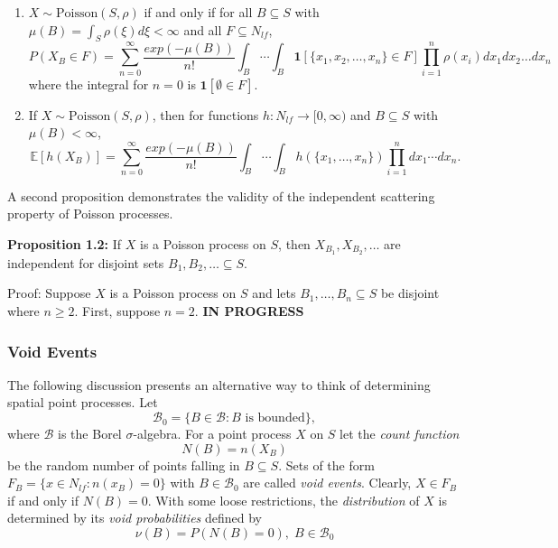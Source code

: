 \documentclass[12pt,twoside]{reedthesis}
\begin{document}
  \begin{enumerate}
  \def\labelenumi{(\roman{enumi})}
  \itemsep1pt\parskip0pt
  \item
    \(X\sim \text{Poisson}(S, \rho)\) if and only if for all
    \(B\subseteq S\) with \(\mu(B) = \int_S \rho(\xi) d\xi < \infty\) and
    all \(F\subseteq N_{lf}\),
    \[P(X_B\in F) = \sum_{n = 0}^\infty \frac{exp(-\mu(B))}{n!} \int_B \cdots \int_B \mathbf{1}[\{x_1, x_2, \dots, x_n\} \in F] \prod_{i = 1}^n \rho(x_i)dx_1dx_2 \dots dx_n\]
    where the integral for \(n = 0\) is \(\mathbf{1} [\emptyset \in F].\)
  \item
    If \(X\sim \text{Poisson}(S, \rho)\), then for functions
    \(h:N_{lf} \rightarrow [0, \infty)\) and \(B\subseteq S\) with
    \(\mu(B) < \infty\),
    \[\mathbb{E} [h(X_B)] = \sum_{n = 0}^\infty \frac{exp(-\mu(B))}{n!} \int_B \cdots \int_B h(\{x_1, \dots, x_n \}) \prod_{i = 1}^n dx_1\cdots dx_n.\]
  \end{enumerate}
  
  A second proposition demonstrates the validity of the independent
  scattering property of Poisson processes.
  
  \textbf{Proposition 1.2:} If \(X\) is a Poisson process on \(S\), then
  \(X_{B_1}, X_{B_2}, \dots\) are independent for disjoint sets
  \(B_1, B_2, \dots \subseteq S\).
  
  Proof: Suppose \(X\) is a Poisson process on \(S\) and lets
  \(B_1, \dots, B_n \subseteq S\) be disjoint where \(n\geq 2\). First,
  suppose \(n = 2\). \textbf{IN PROGRESS}
  
  \subsubsection{Void Events}\label{void-events}
  
  The following discussion presents an alternative way to think of
  determining spatial point processes. Let
  \[ \mathcal{B}_0 = \{B \in \mathcal{B} : B \text{ is bounded}\}, \]
  where \(\mathcal{B}\) is the Borel \(\sigma\)-algebra. For a point
  process \(X\) on \(S\) let the \emph{count function} \[N(B) = n(X_B)\]
  be the random number of points falling in \(B\subseteq S\). Sets of the
  form \(F_B = \{x\in N_{lf}: n(x_B) = 0\}\) with \(B\in \mathcal{B}_0\)
  are called \emph{void events}. Clearly, \(X\in F_B\) if and only if
  \(N(B) = 0\). With some loose restrictions, the \emph{distribution} of
  \(X\) is determined by its \emph{void probabilities} defined by
  \[ \nu (B) = P(N(B)= 0), \; B\in \mathcal{B}_0\]
  
\end{document}
